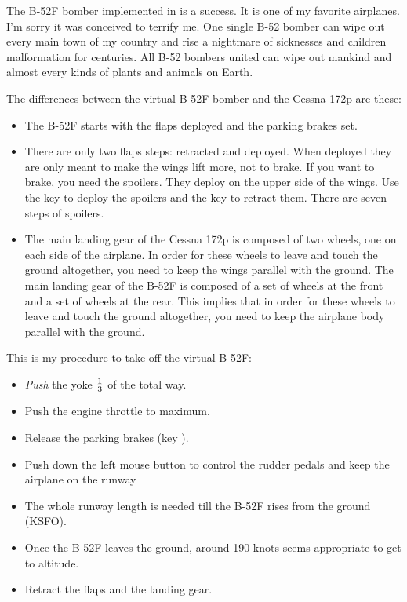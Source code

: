   The B-52F bomber implemented in \FlightGear is a success. It is one of my
  favorite airplanes. I'm sorry it was conceived to terrify me. One
  single B-52 bomber can wipe out every main town of my country and
  rise a nightmare of sicknesses and children malformation for
  centuries. All B-52 bombers united can wipe out mankind and almost
  every kinds of plants and animals on Earth.

  The differences between the virtual B-52F bomber and the Cessna 172p are these:
\begin{itemize}
    \item The B-52F starts with the flaps deployed and the parking brakes set.
    \item There are only two flaps steps: retracted and deployed. When deployed they are only meant to make the wings lift more, not to brake. If you want to brake, you need the spoilers. They deploy on the upper side of the wings. Use the key  to deploy the spoilers and the key  to retract them. There are seven steps of spoilers.
    \item The main landing gear of the Cessna 172p is composed of two wheels, one on each side of the airplane. In order for these wheels to leave and touch the ground altogether, you need to keep the wings parallel with the ground. The main landing gear of the B-52F is composed of a set of wheels at the front and a set of wheels at the rear. This implies that in order for these wheels to leave and touch the ground altogether, you need to keep the airplane body parallel with the ground.
\end{itemize}
This is my procedure to take off the virtual B-52F:
\begin{itemize}
    \item \emph{Push} the yoke  $1\over3$ of the total way.
    \item Push the engine throttle to maximum.
    \item Release the parking brakes (key ).
    \item Push down the left mouse button to control the rudder pedals and keep the airplane on the runway
    \item The whole runway length is needed till the B-52F rises from the ground (KSFO).
    \item Once the B-52F leaves the ground, around 190 knots seems appropriate to get to altitude.
    \item Retract the flaps and the landing gear.
\end{itemize}

